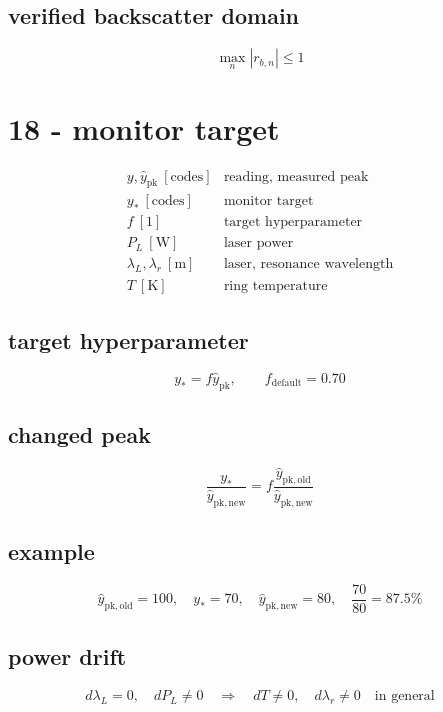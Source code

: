 \subsection*{verified backscatter domain}
\[
\displaystyle \max_n|r_{b,n}|\le1
\]

\clearpage
\section*{18 - monitor target}

\[
\begin{array}{ll}y,\widehat y_{\mathrm{pk}}\ [\mathrm{codes}]&\text{reading, measured peak}\\[0.6em]y_*\ [\mathrm{codes}]&\text{monitor target}\\[0.6em]f\ [1]&\text{target hyperparameter}\\[0.6em]P_L\ [\mathrm W]&\text{laser power}\\[0.6em]\lambda_L,\lambda_r\ [\mathrm m]&\text{laser, resonance wavelength}\\[0.6em]T\ [\mathrm K]&\text{ring temperature}\end{array}
\]

\subsection*{target hyperparameter}
\[
\displaystyle y_*=f\widehat y_{\mathrm{pk}},\qquad f_{\mathrm{default}}=0.70
\]

\subsection*{changed peak}
\[
\displaystyle \frac{y_*}{\widehat y_{\mathrm{pk,new}}}=f\frac{\widehat y_{\mathrm{pk,old}}}{\widehat y_{\mathrm{pk,new}}}
\]

\subsection*{example}
\[
\displaystyle \widehat y_{\mathrm{pk,old}}=100,\quad y_*=70,\quad\widehat y_{\mathrm{pk,new}}=80,\quad\frac{70}{80}=87.5\%
\]

\subsection*{power drift}
\[
\displaystyle d\lambda_L=0,\quad dP_L\ne0\quad\Longrightarrow\quad dT\ne0,\quad d\lambda_r\ne0\quad\text{in general}
\]

\clearpage
